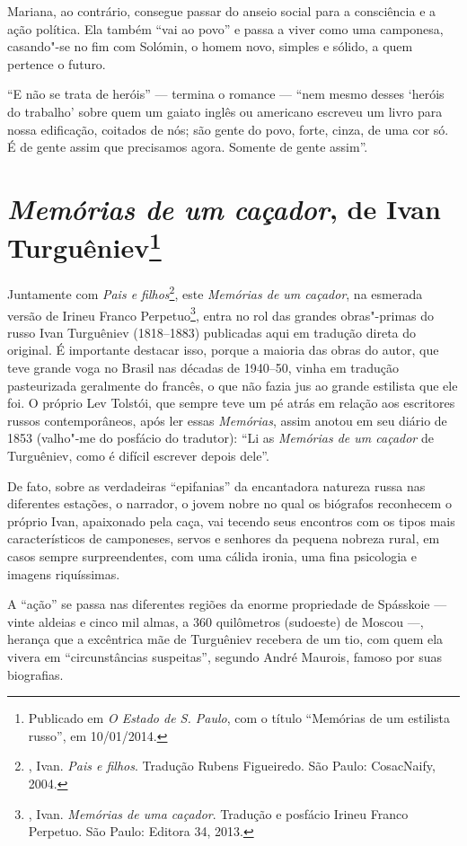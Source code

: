 Mariana, ao contrário, consegue passar do anseio social para a
consciência e a ação política. Ela também ``vai ao povo'' e passa a
viver como uma camponesa, casando"-se no fim com Solómin, o homem novo,
simples e sólido, a quem pertence o futuro.

``E não se trata de heróis'' --- termina o romance --- ``nem mesmo desses
`heróis do trabalho' sobre quem um gaiato inglês ou americano escreveu
um livro para nossa edificação, coitados de nós; são gente do povo,
forte, cinza, de uma cor só. É de gente assim que precisamos agora.
Somente de gente assim''.

\chapter{\emph{Memórias de um caçador}, de Ivan Turguêniev\footnote{Publicado
  em \emph{O Estado de S. Paulo}, com o título ``Memórias de um
  estilista russo'', em 10/01/2014.}}

Juntamente com \emph{Pais e filhos}\footnote{, Ivan. \emph{Pais e filhos}. Tradução Rubens Figueiredo. São Paulo: CosacNaify, 2004.}, este \emph{Memórias de um caçador}, na esmerada
versão de Irineu Franco Perpetuo\footnote{, Ivan.
  \emph{Memórias de uma caçador}. Tradução e posfácio Irineu Franco
  Perpetuo. São Paulo: Editora 34, 2013.}, entra no rol das grandes
obras"-primas do russo Ivan Turguêniev (1818--1883) publicadas aqui em
tradução direta do original. É importante destacar isso, porque a
maioria das obras do autor, que teve grande voga no Brasil nas décadas
de 1940--50, vinha em tradução pasteurizada geralmente do francês, o que
não fazia jus ao grande estilista que ele foi. O próprio Lev Tolstói,
que sempre teve um pé atrás em relação aos escritores russos
contemporâneos, após ler essas \emph{Memórias}, assim anotou em seu
diário de 1853 (valho"-me do posfácio do tradutor): ``Li as \emph{Memórias
de um caçador} de Turguêniev, como é difícil escrever depois dele''.

De fato, sobre as verdadeiras ``epifanias'' da encantadora natureza russa
nas diferentes estações, o narrador, o jovem nobre no qual os biógrafos
reconhecem o próprio Ivan, apaixonado pela caça, vai tecendo seus
encontros com os tipos mais característicos de camponeses, servos e
senhores da pequena nobreza rural, em casos sempre surpreendentes, com
uma cálida ironia, uma fina psicologia e imagens riquíssimas.

A ``ação'' se passa nas diferentes regiões da enorme propriedade de
Spásskoie --- vinte aldeias e cinco mil almas, a 360 quilômetros
(sudoeste) de Moscou ---, herança que a excêntrica mãe de Turguêniev
recebera de um tio, com quem ela vivera em ``circunstâncias suspeitas'',
segundo André Maurois, famoso por suas biografias.

